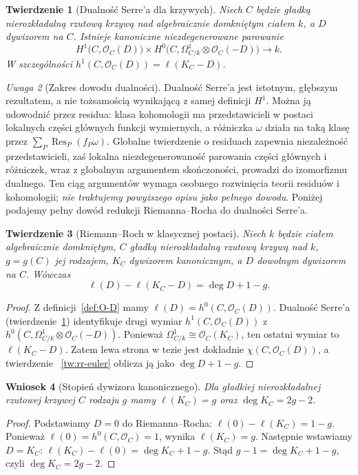 \documentclass[11pt,a4paper,openany]{report}
\numberwithin{equation}{section}
\theoremstyle{plain}
\newtheorem{twierdzenie}{Twierdzenie}[section]
\newtheorem{wniosek}[twierdzenie]{Wniosek}
\theoremstyle{definition}
\theoremstyle{remark}
\newtheorem{uwaga}[twierdzenie]{Uwaga}
\begin{document}
\begin{twierdzenie}[Dualność Serre'a dla krzywych]
\label{tw:serre-curve}
Niech $C$ będzie gładką nierozkładalną rzutową
krzywą nad algebraicznie domkniętym ciałem $k$,
a $D$ dywizorem na $C$. Istnieje kanoniczne
niezdegenerowane parowanie
\[
 H^1\bigl(C,\mathcal O_C(D)\bigr)
 \times H^0\bigl(C,\Omega^1_{C/k}\otimes
 \mathcal O_C(-D)\bigr)\longrightarrow k.
\]
W szczególności
$h^1(C,\mathcal O_C(D))=\ell(K_C-D)$.
\end{twierdzenie}

\begin{uwaga}[Zakres dowodu dualności]
Dualność Serre'a jest istotnym, głębszym rezultatem,
a nie tożsamością wynikającą z samej definicji
$H^1$. Można ją udowodnić przez residua:
klasa kohomologii ma przedstawicieli w postaci
lokalnych części głównych funkcji wymiernych,
a różniczka $\omega$ działa na taką klasę przez
$\sum_P\operatorname{Res}_P(f_P\omega)$.
Globalne twierdzenie o residuach zapewnia
niezależność przedstawicieli, zaś lokalna
niezdegenerowaność parowania części głównych
i różniczek, wraz z globalnym argumentem
skończoności, prowadzi do izomorfizmu dualnego.
Ten ciąg argumentów wymaga osobnego rozwinięcia
teorii residuów i kohomologii; \emph{nie traktujemy
powyższego opisu jako pełnego dowodu}.
Poniżej podajemy pełny dowód redukcji
Riemanna--Rocha do dualności Serre'a.
\end{uwaga}

\begin{twierdzenie}[Riemann--Roch w klasycznej postaci]
\label{tw:rr}
Niech $k$ będzie ciałem algebraicznie domkniętym,
$C$ gładką nierozkładalną rzutową krzywą nad $k$,
$g=g(C)$ jej rodzajem, $K_C$ dywizorem kanonicznym,
a $D$ dowolnym dywizorem na $C$. Wówczas
\[
 \ell(D)-\ell(K_C-D)=\deg D+1-g.
\]
\end{twierdzenie}
\begin{proof}
Z definicji~\ref{def:O-D} mamy
$\ell(D)=h^0(C,\mathcal O_C(D))$.
Dualność Serre'a (twierdzenie~\ref{tw:serre-curve})
identyfikuje drugi wymiar
$h^1(C,\mathcal O_C(D))$ z
$h^0(C,\Omega^1_{C/k}\otimes\mathcal O_C(-D))$.
Ponieważ $\Omega^1_{C/k}\cong\mathcal O_C(K_C)$,
ten ostatni wymiar to $\ell(K_C-D)$.
Zatem lewa strona w tezie jest dokładnie
$\chi(C,\mathcal O_C(D))$, a twierdzenie
~\ref{tw:rr-euler} oblicza ją jako
$\deg D+1-g$.
\end{proof}

\begin{wniosek}[Stopień dywizora kanonicznego]
\label{wn:degK}
Dla gładkiej nierozkładalnej rzutowej krzywej
$C$ rodzaju $g$ mamy $\ell(K_C)=g$
oraz $\deg K_C=2g-2$.
\end{wniosek}
\begin{proof}
Podstawiamy $D=0$ do Riemanna--Rocha:
$\ell(0)-\ell(K_C)=1-g$. Ponieważ
$\ell(0)=h^0(C,\mathcal O_C)=1$,
wynika $\ell(K_C)=g$. Następnie wstawiamy
$D=K_C$: $\ell(K_C)-\ell(0)=\deg K_C+1-g$.
Stąd $g-1=\deg K_C+1-g$, czyli
$\deg K_C=2g-2$.
\end{proof}
\end{document}
